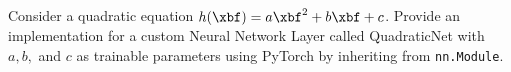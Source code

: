 \documentclass[11pt,letterpaper]{article}
\begin{document}
\begin{tcolorbox}[codebox]


\bigskip

\bigskip

\bigskip

\bigskip

\bigskip

\bigskip

\bigskip

\bigskip

\bigskip

\bigskip

\bigskip

\bigskip

\bigskip

\bigskip

\bigskip

\bigskip

\bigskip

\bigskip

\bigskip

\bigskip

\bigskip

\bigskip

\bigskip

\bigskip

\end{tcolorbox}

\subsection{}

Consider a quadratic equation $ h(\xbf) = a\xbf^2 + b \xbf + c$. Provide an implementation for a custom Neural Network Layer called QuadraticNet with $a, b,$ and $c$ as trainable parameters using PyTorch by inheriting from \texttt{nn.Module}.
\end{document}

